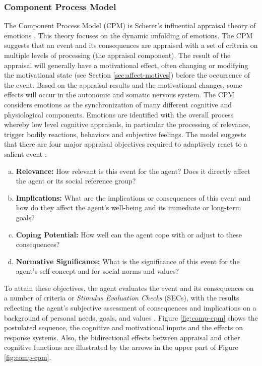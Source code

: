 \documentclass[12pt]{report}
\begin{document}
\subsubsection{Component Process Model}
\label{sec:cpm}

The Component Process Model (CPM) is Scherer's influential appraisal theory of
emotions
\cite{scherer:sequential-appraisal-process,scherer:appraisal-processes}. This
theory focuses on the dynamic unfolding of emotions. The CPM suggests that an
event and its consequences are appraised with a set of criteria on multiple
levels of processing (the appraisal component). The result of the appraisal will
generally have a motivational effect, often changing or modifying the
motivational state (see Section \ref{sec:affect-motives}) before the occurrence
of the event. Based on the appraisal results and the motivational changes, some
effects will occur in the autonomic and somatic nervous system. The CPM
considers emotions as the synchronization of many different cognitive and
physiological components. Emotions are identified with the overall process
whereby low level cognitive appraisals, in particular the processing of
relevance, trigger bodily reactions, behaviors and subjective feelings. The
model suggests that there are four major appraisal objectives required to
adaptively react to a salient event \cite{scherer:dynamic-architecture-emotion}:

\begin{enumerate}[a)]
  \item \textbf{Relevance:} How relevant is this event for the agent? Does it
  directly affect the agent or its social reference group?
  \item \textbf{Implications:} What are the implications or consequences of this
  event and how do they affect the agent's well-being and its immediate or
  long-term goals?
  \item \textbf{Coping Potential:} How well can the agent cope with or adjust to
  these consequences?
  \item \textbf{Normative Significance:} What is the significance of this event
  for the agent's self-concept and for social norms and values?
\end{enumerate}

To attain these objectives, the agent evaluates the event and its consequences
on a number of criteria or \textit{Stimulus Evaluation Checks} (SECs), with the
results reflecting the agent’s subjective assessment of consequences and
implications on a background of personal needs, goals, and values
\cite{scherer:appraisal-processes}. Figure \ref{fig:comp-cpm} shows the
postulated sequence, the cognitive and motivational inputs and the effects on
response systems. Also, the bidirectional effects between appraisal and other
cognitive functions are illustrated by the arrows in the upper part of Figure
\ref{fig:comp-cpm}.
\end{document}
